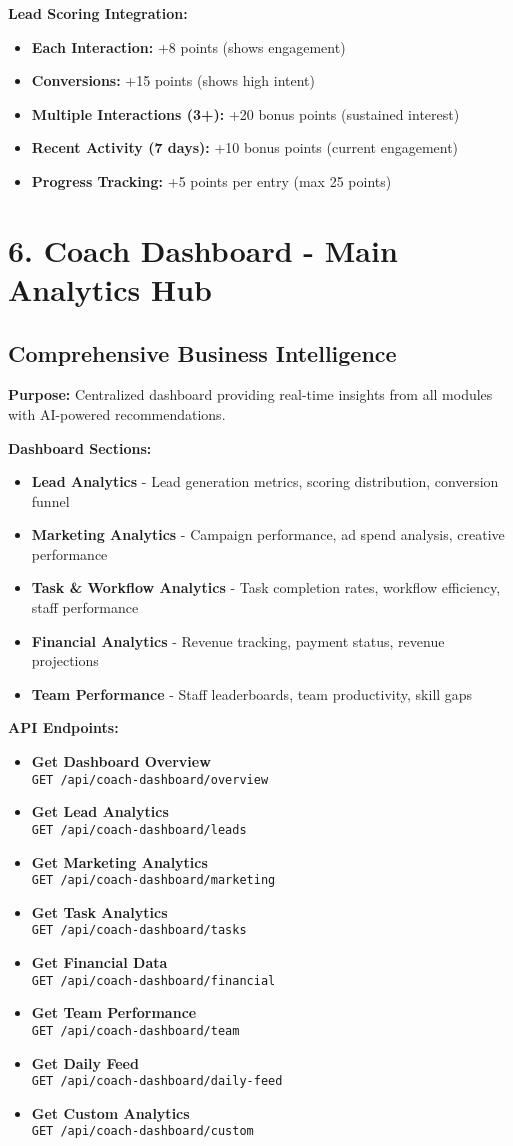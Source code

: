 \documentclass[12pt,a4paper]{article}
\newcommand{\apiendpoint}[2]{\textbf{#1} \\ \texttt{#2}}
\begin{document}
\textbf{Lead Scoring Integration:}
\begin{itemize}
    \item \textbf{Each Interaction:} +8 points (shows engagement)
    \item \textbf{Conversions:} +15 points (shows high intent)
    \item \textbf{Multiple Interactions (3+):} +20 bonus points (sustained interest)
    \item \textbf{Recent Activity (7 days):} +10 bonus points (current engagement)
    \item \textbf{Progress Tracking:} +5 points per entry (max 25 points)
\end{itemize}

\section{6. Coach Dashboard - Main Analytics Hub}

\subsection{Comprehensive Business Intelligence}
\textbf{Purpose:} Centralized dashboard providing real-time insights from all modules with AI-powered recommendations.

\textbf{Dashboard Sections:}
\begin{itemize}
    \item \textbf{Lead Analytics} - Lead generation metrics, scoring distribution, conversion funnel
    \item \textbf{Marketing Analytics} - Campaign performance, ad spend analysis, creative performance
    \item \textbf{Task \& Workflow Analytics} - Task completion rates, workflow efficiency, staff performance
    \item \textbf{Financial Analytics} - Revenue tracking, payment status, revenue projections
    \item \textbf{Team Performance} - Staff leaderboards, team productivity, skill gaps
\end{itemize}

\textbf{API Endpoints:}
\begin{itemize}
    \item \apiendpoint{Get Dashboard Overview}{GET /api/coach-dashboard/overview}
    \item \apiendpoint{Get Lead Analytics}{GET /api/coach-dashboard/leads}
    \item \apiendpoint{Get Marketing Analytics}{GET /api/coach-dashboard/marketing}
    \item \apiendpoint{Get Task Analytics}{GET /api/coach-dashboard/tasks}
    \item \apiendpoint{Get Financial Data}{GET /api/coach-dashboard/financial}
    \item \apiendpoint{Get Team Performance}{GET /api/coach-dashboard/team}
    \item \apiendpoint{Get Daily Feed}{GET /api/coach-dashboard/daily-feed}
    \item \apiendpoint{Get Custom Analytics}{GET /api/coach-dashboard/custom}
\end{itemize}
\end{document}
